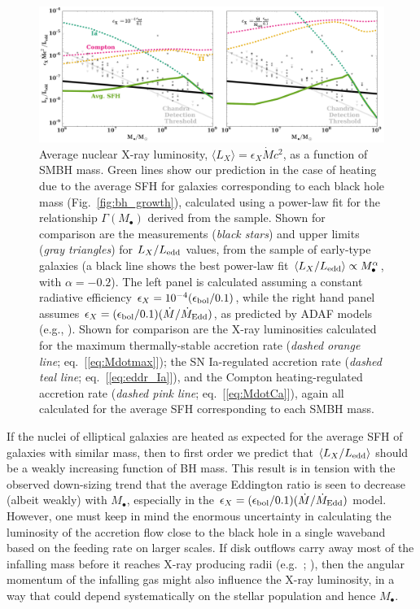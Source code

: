 \documentclass[usenatbib,fleqn]{mn2e}
\newcommand{\Mdot}{\dot{M}}
\newcommand{\MdotEdd}{\dot{M}_{\rm Edd}}
\begin{document}
\begin{figure}
\includegraphics[width=\textwidth]{miller.pdf}
\caption{\label{fig:miller} Average nuclear X-ray luminosity, $\langle
  L_X \rangle = \epsilon_X \Mdot c^2$, as a function of SMBH mass.
  Green lines show our prediction in the case of heating due to the
  average SFH for galaxies corresponding to each black hole mass
  (Fig.~\ref{fig:bh_growth}), calculated using a power-law fit for the
  relationship $\Gamma(M_{\bullet})$ derived from the
  \citet{LauerFaber+:2007a} sample.  Shown for comparison are the
  measurements ({\it black stars}) and upper limits ({\it gray 
    triangles}) for $L_X/L_{\rm edd}$ values, from the
  \citet{Miller+15} sample of early-type galaxies (a black line shows
  the best power-law fit $\langle L_X/L_{\rm edd}\rangle \propto
  M_{\bullet}^{\alpha}$, with $\alpha = -0.2$).  The left panel is
  calculated assuming a constant radiative efficiency
  $\epsilon_X=10^{-4} (\epsilon_{\rm bol}/0.1)$, while the right hand
  panel assumes $\epsilon_X= (\epsilon_{\rm
    bol}/0.1)(\Mdot/\MdotEdd)$, as predicted by ADAF models (e.g.,
  \citealt{Narayan&Yi95}).  Shown for comparison are the X-ray
  luminosities calculated for the maximum thermally-stable accretion
  rate ({\it dashed orange line}; eq.~[\ref{eq:Mdotmax}]); the SN
  Ia-regulated accretion rate ({\it dashed teal line};
  eq.~[\ref{eq:eddr_Ia}]), and the Compton heating-regulated accretion
  rate ({\it dashed pink line}; eq.~[\ref{eq:MdotCa}]), again all
  calculated for the average SFH corresponding to each SMBH mass.}
\end{figure}

If the nuclei of elliptical galaxies are heated as expected for the average SFH of galaxies with
similar mass, then to first order we predict that $\langle
L_{X}/L_{\rm edd}\rangle$ should be a weakly increasing function of BH mass.
This result is in tension with the observed down-sizing trend that the average Eddington ratio is seen to
decrease (albeit weakly) with $M_{\bullet}$, especially in the $\epsilon_X= (\epsilon_{\rm
  bol}/0.1)(\Mdot/\MdotEdd)$ model.  However, one must keep in mind the enormous uncertainty in calculating the luminosity of the accretion flow close to the black hole in a single waveband based on the feeding rate on larger scales.  If disk outflows carry away most of the infalling mass before it reaches X-ray producing radii (e.g.~\citealt{Blandford&Begelman99}; \citealt{Li+13}), then the angular momentum of the infalling gas might also influence the X-ray luminosity, in a way that could depend systematically on the stellar population and hence $M_{\bullet}$.
\end{document}
